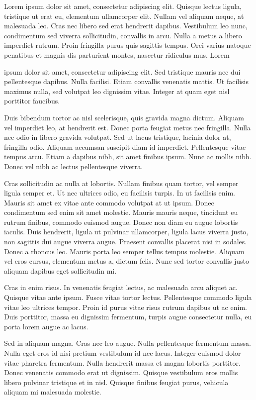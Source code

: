 \documentclass{book}
\begin{document}
Lorem ipsum dolor sit amet, consectetur adipiscing elit. Quisque lectus ligula,
tristique ut erat eu, elementum ullamcorper elit. Nullam vel aliquam neque, at
malesuada leo. Cras nec libero sed erat hendrerit dapibus. Vestibulum leo nunc,
condimentum sed viverra sollicitudin, convallis in arcu. Nulla a metus a libero
imperdiet rutrum. Proin fringilla purus quis sagittis tempus. Orci varius
natoque penatibus et magnis dis parturient montes, nascetur ridiculus mus. Lorem

ipsum dolor sit amet, consectetur adipiscing elit. Sed tristique mauris nec dui
pellentesque dapibus. Nulla facilisi. Etiam convallis venenatis mattis. Ut
facilisis maximus nulla, sed volutpat leo dignissim vitae. Integer at quam eget
nisl porttitor faucibus.

Duis bibendum tortor ac nisl scelerisque, quis gravida magna dictum. Aliquam vel
imperdiet leo, at hendrerit est. Donec porta feugiat metus nec fringilla. Nulla
nec odio in libero gravida volutpat. Sed ut lacus tristique, lacinia dolor at,
fringilla odio. Aliquam accumsan suscipit diam id imperdiet. Pellentesque vitae
tempus arcu. Etiam a dapibus nibh, sit amet finibus ipsum. Nunc ac mollis
nibh. Donec vel nibh ac lectus pellentesque viverra.

Cras sollicitudin ac nulla at lobortis. Nullam finibus quam tortor, vel semper
ligula semper et. Ut nec ultrices odio, eu facilisis turpis. In ut facilisis
enim. Mauris sit amet ex vitae ante commodo volutpat at ut ipsum. Donec
condimentum sed enim sit amet molestie. Mauris mauris neque, tincidunt eu rutrum
finibus, commodo euismod augue. Donec non diam eu augue lobortis iaculis. Duis
hendrerit, ligula ut pulvinar ullamcorper, ligula lacus viverra justo, non
sagittis dui augue viverra augue. Praesent convallis placerat nisi in
sodales. Donec a rhoncus leo. Mauris porta leo semper tellus tempus
molestie. Aliquam vel eros cursus, elementum metus a, dictum felis. Nunc sed
tortor convallis justo aliquam dapibus eget sollicitudin mi.

Cras in enim risus. In venenatis feugiat lectus, ac malesuada arcu aliquet
ac. Quisque vitae ante ipsum. Fusce vitae tortor lectus. Pellentesque commodo
ligula vitae leo ultrices tempor. Proin id purus vitae risus rutrum dapibus ut
ac enim. Duis porttitor, massa eu dignissim fermentum, turpis augue consectetur
nulla, eu porta lorem augue ac lacus.

Sed in aliquam magna. Cras nec leo augue. Nulla pellentesque fermentum
massa. Nulla eget eros id nisi pretium vestibulum id nec lacus. Integer euismod
dolor vitae pharetra fermentum. Nulla hendrerit massa et magna lobortis
porttitor. Donec venenatis commodo erat ut dignissim. Quisque vestibulum eros
mollis libero pulvinar tristique et in nisl. Quisque finibus feugiat purus,
vehicula aliquam mi malesuada molestie.
\end{document}
